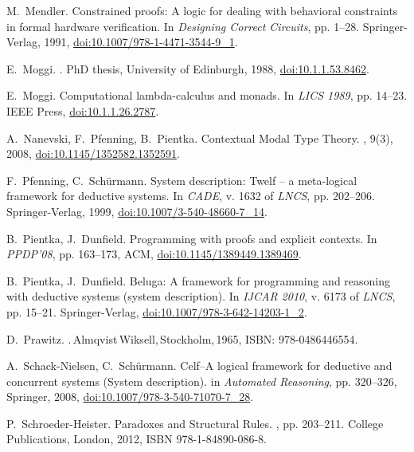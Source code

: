 \documentclass[submission,copyright,creativecommons]{eptcs}
\theoremstyle{plain}
\theoremstyle{definition}
\begin{document}
 M.~Mendler.  \newblock Constrained
  proofs: A logic for dealing with behavioral constraints in formal
  hardware verification.  \newblock In {\em Designing Correct
    Circuits}, pp. 1--28. Springer-Verlag, 1991,
  \url{doi:10.1007/978-1-4471-3544-9\_1}.

 E.~Moggi.  .  \newblock PhD thesis, University of Edinburgh,
  1988, \url{doi:10.1.1.53.8462}.

 E.~Moggi.  \newblock Computational
  lambda-calculus and monads.  \newblock In {\em LICS 1989},
  pp. 14--23. IEEE Press, \url{doi:10.1.1.26.2787}.

 A.~Nanevski, F.~Pfenning, B.~Pientka.  \newblock
  {Contextual Modal Type Theory}.  , 9(3),
  2008, \url{doi:10.1145/1352582.1352591}.

 F.~Pfenning, C.~Sch{\"u}rmann.  \newblock
  System description: Twelf -- a meta-logical framework for deductive
  systems.  \newblock In {\em CADE}, v. 1632 of {\em LNCS},
  pp. 202--206. Springer-Verlag, 1999, \url{doi:10.1007/3-540-48660-7\_14}.

 B.~Pientka, J.~Dunfield.
  \newblock Programming with proofs and explicit contexts.  \newblock
  In {\em PPDP'08}, pp. 163--173, ACM, \url{doi:10.1145/1389449.1389469}.

 B.~Pientka, J.~Dunfield.  \newblock Beluga: A
  framework for programming and reasoning with deductive systems
  (system description).  \newblock In {\em IJCAR 2010}, v. 6173 of
  {\em LNCS}, pp. 15--21. Springer-Verlag,
  \url{doi:10.1007/978-3-642-14203-1\_2}.

 D.~Prawitz.  .\,{Almqvist\,Wiksell,\,Stockholm},\,1965,
  ISBN: 978-0486446554.

 A.~Schack-Nielsen, C.~Sch{\"u}rmann.  \newblock Celf--A
  logical framework for deductive and concurrent systems (System
  description).  \newblock in {\em Automated Reasoning}, pp. 320--326,
  Springer, 2008, \url{doi:10.1007/978-3-540-71070-7\_28}.

 P.~Schroeder-Heister.  \newblock
  {Paradoxes and Structural Rules}.  , pp.
  203--211. College Publications, London, 2012, ISBN
  978-1-84890-086-8.
\end{document}
